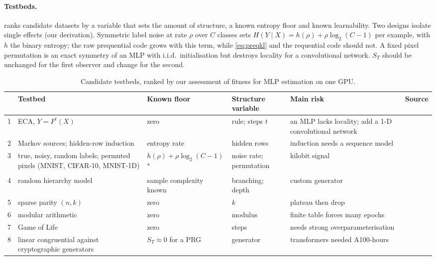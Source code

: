 \documentclass[11pt]{article}
\newcommand{\od}{\textsuperscript{$\ast$}}
\theoremstyle{tight}
\begin{document}
\paragraph{Testbeds.}  ranks candidate datasets by a variable that sets the amount
of structure, a known entropy floor and known learnability. Two designs isolate single effects (our
derivation). Symmetric label noise at rate
$\rho$ over $C$ classes sets $H(Y\mid X)=h(\rho)+\rho\log_2(C-1)$ per example, with $h$ the binary
entropy; the raw prequential code grows with this term, while \eqref{eq:preqkl} and the requential
code should not. A fixed pixel permutation is an exact symmetry of an MLP with i.i.d.\ initialisation
but destroys locality for a convolutional network. $S_T$ should be unchanged for the first observer
and change for the second.

\begin{table}[!htb]
\centering\footnotesize
\caption{Candidate testbeds, ranked by our assessment of fitness for MLP estimation on one GPU.}\label{tab:testbeds}
\begin{tabularx}{\textwidth}{@{}rP{4.0cm}P{2.3cm}P{2.1cm}LP{2.5cm}@{}}
\toprule
& Testbed & Known floor & Structure variable & Main risk & Source \\
 & ECA, $Y=F^t(X)$ & zero & rule; steps $t$ & an MLP lacks locality; add a 1-D convolutional network & \citet{finzi2026epiplexity} \\
2 & Markov sources; hidden-row induction & entropy rate & hidden rows & induction needs a sequence model & \citet{edelman2024induction} \\
3 & true, noisy, random labels; permuted pixels (MNIST, CIFAR-10, MNIST-1D) & $h(\rho)+\rho\log_2(C-1)$\od & noise rate; permutation & kilobit signal & \citet{zhang2017rethinking,greydanus2020} \\
4 & random hierarchy model & sample complexity known & branching; depth & custom generator & \citet{cagnetta2024rhm} \\
5 & sparse parity $(n,k)$ & zero & $k$ & plateau then drop & \citet{barak2022parity} \\
6 & modular arithmetic & zero & modulus & finite table forces many epochs & \citet{nanda2023,gromov2023} \\
7 & Game of Life & zero & steps & needs strong overparameterisation & \citet{springer2020life} \\
8 & linear congruential against cryptographic generators & $S_T\approx0$ for a PRG & generator & transformers needed A100-hours & \citet{tao2025lcg} \\
\bottomrule
\end{tabularx}
\end{table}
\end{document}
